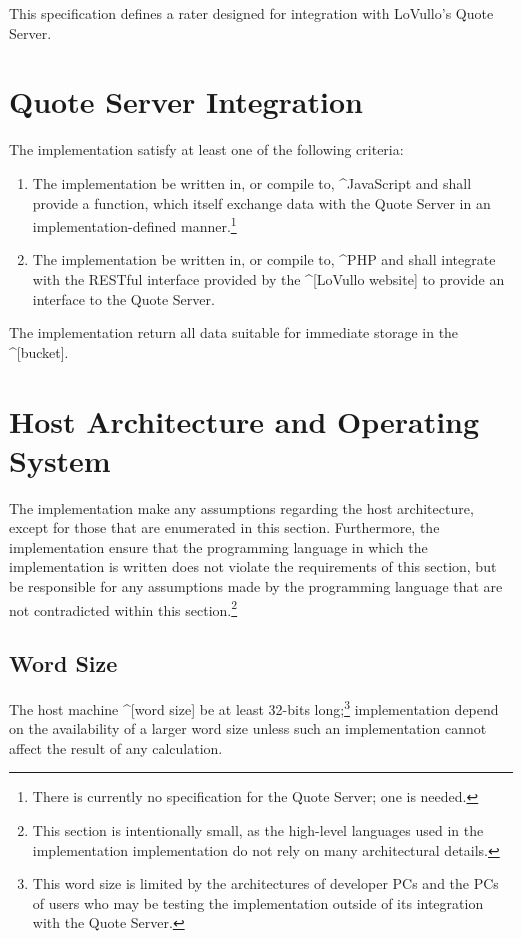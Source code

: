 

\def\minmem{$128$~megabytes}

This specification defines a rater designed for integration with LoVullo's Quote
Server.

\section{Quote Server Integration}
\label{s:hostenv-qs}

\incomplete The implementation \must satisfy at least one of the following
criteria:
\begin{enumerate}
  \item
  The implementation \shall be written in, or compile to, ^JavaScript and shall
  provide a  function, which \shall itself exchange data with the
  Quote Server in an implementation-defined manner.\footnote{There is currently
  no specification for the Quote Server; one is needed.}

  \item
  The implementation \shall be written in, or compile to, ^PHP and shall
  integrate with the RESTful interface provided by the ^[LoVullo
  website] to provide an interface to the Quote Server.
\end{enumerate}

The implementation \shall return all data suitable for immediate storage in the
^[bucket].


\section{Host Architecture and Operating System}
The implementation \shallnot make any assumptions regarding the host
architecture, except for those that are enumerated in this section. Furthermore,
the implementation \shall ensure that the programming language in which the
implementation is written does not violate the requirements of this section, but
\shallnot be responsible for any assumptions made by the programming language
that are not contradicted within this section.\footnote{This section is
intentionally small, as the high-level languages used in the implementation
implementation do not rely on many architectural details.}


\subsection{Word Size}
 The host machine ^[word size] \shall be at least 32-bits
long;\footnote{This word size is limited by the architectures of developer PCs
and the PCs of users who may be testing the implementation outside of its
integration with the Quote Server.} implementation \shallnot depend on the
availability of a larger word size unless such an implementation cannot affect
the result of any calculation.

